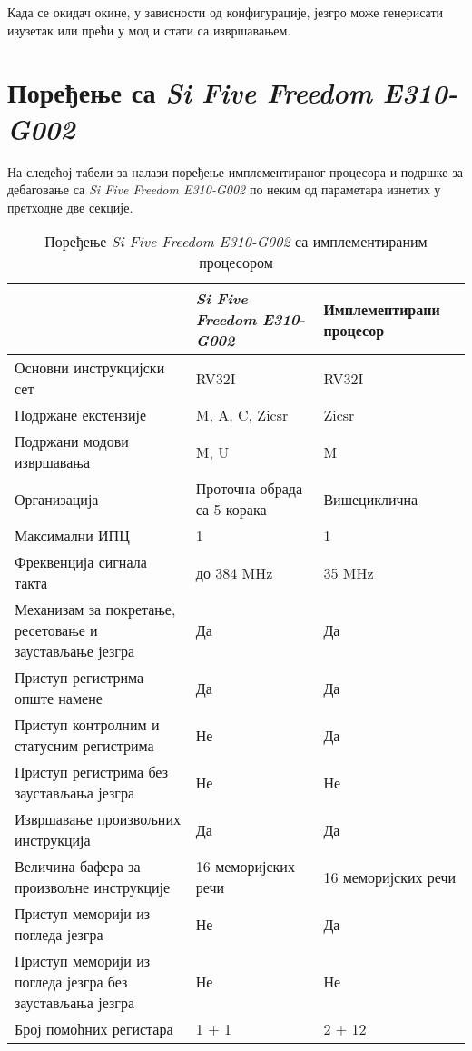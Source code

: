 Када се окидач окине, у зависности од конфигурације, језгро може генерисати изузетак или прећи у  мод и стати са извршавањем.

\section{Поређење са \textit{Si Five Freedom E310-G002}}

На следећој табели за налази поређење имплементираног процесора и подршке за дебаговање са \textit{Si Five Freedom E310-G002}\cite{hifive_manual} по неким од параметара изнетих у претходне две секције.

\begin{table}[h!]
	\centering
	\caption{Поређење \textit{Si Five Freedom E310-G002} са имплементираним процесором}
	\label{table:comp}
	\begin{tabular}{|p{5.5cm}|l|l|} 
		\hline \rowcolor{lightgray} & \textit{Si Five Freedom E310-G002} & Имплементирани процесор \\
		\hline Основни инструкцијски сет & RV32I & RV32I \\
		\hline Подржане екстензије & M, A, C, Zicsr & Zicsr \\
		\hline Подржани модови извршавања & M, U & M \\
		\hline Организација & Проточна обрада са 5 корака & Вишециклична \\
		\hline Максимални \acrshort{ИПЦ}\footnotemark & 1 & 1 \\
		\hline Фреквенција сигнала такта & до 384 MHz & 35 MHz \\
		\hline Механизам за покретање, ресетовање и заустављање језгра & Да & Да \\
		\hline Приступ регистрима опште намене & Да & Да \\
		\hline Приступ контролним и статусним регистрима & Не & Да \\
		\hline Приступ регистрима без заустављања језгра & Не & Не \\
		\hline Извршавање произвољних инструкција & Да & Да \\
		\hline Величина бафера за произвољне инструкције & 16 меморијских речи & 16 меморијских речи \\
		\hline Приступ меморији из погледа језгра & Не & Да \\
		\hline Приступ меморији из погледа језгра без заустављања језгра & Не & Не \\
		\hline Број помоћних регистара\footnotemark & 1 + 1 & 2 + 12 \\

\end{tabular}
\end{table}
